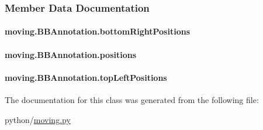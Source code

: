 \subsubsection{Member Data Documentation}
\hypertarget{classmoving_1_1BBAnnotation_abc54d8997043b819f76dced20c48b94d}{
\paragraph[{bottom\-Right\-Positions}]{\setlength{\rightskip}{0pt plus 5cm}moving.\-B\-B\-Annotation.\-bottom\-Right\-Positions}}\label{classmoving_1_1BBAnnotation_abc54d8997043b819f76dced20c48b94d}
\hypertarget{classmoving_1_1BBAnnotation_a0f4ee909fb7d67b60f5abc94943207c5}{
\paragraph[{positions}]{\setlength{\rightskip}{0pt plus 5cm}moving.\-B\-B\-Annotation.\-positions}}\label{classmoving_1_1BBAnnotation_a0f4ee909fb7d67b60f5abc94943207c5}
\hypertarget{classmoving_1_1BBAnnotation_a5ccafeea40b41e138d54c6cbcf11ae1f}{
\paragraph[{top\-Left\-Positions}]{\setlength{\rightskip}{0pt plus 5cm}moving.\-B\-B\-Annotation.\-top\-Left\-Positions}}\label{classmoving_1_1BBAnnotation_a5ccafeea40b41e138d54c6cbcf11ae1f}


The documentation for this class was generated from the following file\-:\begin{DoxyCompactItemize}
\item 
python/\hyperlink{moving_8py}{moving.\-py}\end{DoxyCompactItemize}
